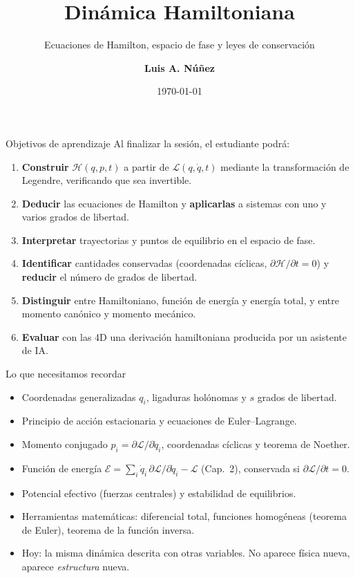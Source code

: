 \documentclass[spanish]{beamer}
\title[Dinámica Hamiltoniana]{\textbf{Dinámica Hamiltoniana}}
\subtitle{Ecuaciones de Hamilton, espacio de fase y leyes de conservación}
\author[L.A. Núñez]{\textbf{Luis A. Núñez}}
\institute[UIS]{\textit{Escuela de Física, Facultad de Ciencias,}\\
  \textit{Universidad Industrial de Santander, Santander, Colombia}\\
  \insertarlogo}
\date{\today}
\newcommand{\Lag}{\mathcal{L}}               %
\newcommand{\Ham}{\mathcal{H}}               %
\newcommand{\Ene}{\mathcal{E}}               %
\begin{document}
\begin{frame}
  \titlepage
\end{frame}


\begin{frame}{Objetivos de aprendizaje}
Al finalizar la sesión, el estudiante podrá:
\begin{enumerate}[<+->]
  \item \textbf{Construir} $\Ham(q,p,t)$ a partir de $\Lag(q,\dot q,t)$ mediante
        la transformación de Legendre, verificando que sea invertible.
  \item \textbf{Deducir} las ecuaciones de Hamilton y \textbf{aplicarlas} a
        sistemas con uno y varios grados de libertad.
  \item \textbf{Interpretar} trayectorias y puntos de equilibrio en el espacio de fase.
  \item \textbf{Identificar} cantidades conservadas (coordenadas cíclicas,
        $\partial\Ham/\partial t=0$) y \textbf{reducir} el número de grados de libertad.
  \item \textbf{Distinguir} entre Hamiltoniano, función de energía y energía total,
        y entre momento canónico y momento mecánico.
  \item \textbf{Evaluar} con las 4D una derivación hamiltoniana producida por un asistente de IA.
\end{enumerate}
\end{frame}

\begin{frame}{Lo que necesitamos recordar}
\begin{itemize}[<+->]
  \item Coordenadas generalizadas $q_i$, ligaduras holónomas y $s$ grados de libertad.
  \item Principio de acción estacionaria y ecuaciones de Euler--Lagrange.
  \item Momento conjugado $p_i=\partial\Lag/\partial\dot q_i$, coordenadas cíclicas
        y teorema de Noether.
  \item Función de energía $\Ene=\sum_i\dot q_i\,\partial\Lag/\partial\dot q_i-\Lag$ (Cap.~2),
        conservada si $\partial\Lag/\partial t=0$.
  \item Potencial efectivo (fuerzas centrales) y estabilidad de equilibrios.
  \item Herramientas matemáticas: diferencial total, funciones homogéneas
        (teorema de Euler), teorema de la función inversa.
  \item[] \alert{Hoy:} la misma dinámica descrita con otras variables.
        No aparece física nueva, aparece \emph{estructura} nueva.
\end{itemize}
\end{frame}
\end{document}
